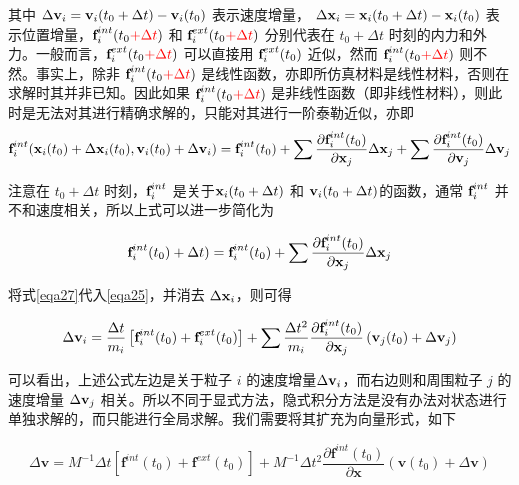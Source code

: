 其中 $\Delta \textbf{v}_i = \textbf{v}_i(t_0 + \Delta t) - \textbf{v}_i(t_0)$ 表示速度增量， $\Delta \textbf{x}_i = \textbf{x}_i(t_0 + \Delta t) - \textbf{x}_i(t_0)$ 表示位置增量，$\textbf{f}_i^{int}(t_0 \textcolor{red}{+ \Delta t})$ 和 $\textbf{f}_i^{ext}(t_0 \textcolor{red}{+ \Delta t})$ 分别代表在 $t_0 + \Delta t$ 时刻的内力和外力。一般而言，$\textbf{f}_i^{ext}(t_0 \textcolor{red}{+ \Delta t})$ 可以直接用 $\textbf{f}_i^{ext}(t_0)$ 近似，然而 $\textbf{f}_i^{int}(t_0 \textcolor{red}{+ \Delta t})$ 则不然。事实上，除非 $\textbf{f}_i^{int}(t_0 \textcolor{red}{+ \Delta t})$ 是线性函数，亦即所仿真材料是线性材料，否则在求解时其并非已知。因此如果 $\textbf{f}_i^{int}(t_0 \textcolor{red}{+ \Delta t})$ 是非线性函数（即非线性材料），则此时是无法对其进行精确求解的，只能对其进行一阶泰勒近似，亦即
\begin{equation}
\textbf{f}_i^{int}(\textbf{x}_i(t_0) + \Delta \textbf{x}_i(t_0),\textbf{v}_i(t_0)+\Delta \textbf{v}_i) = \textbf{f}_i^{int}(t_0) +
                                                         \sum\frac{\partial \textbf{f}_i^{int}(t_0)}{\partial \textbf{x}_j}\Delta \textbf{x}_j+
                                                         \sum\frac{\partial \textbf{f}_i^{int}(t_0)}{\partial \textbf{v}_j}\Delta \textbf{v}_j
\end{equation}

注意在 $t_0 + \Delta t$ 时刻，$\textbf{f}_i^{int}$ 是关于$\textbf{x}_i(t_0 + \Delta t)$ 和 $\textbf{v}_i(t_0 + \Delta t)$的函数，通常 $\textbf{f}_i^{int}$ 并不和速度相关，所以上式可以进一步简化为

\begin{equation}
\label{eqa27}
\textbf{f}_i^{int}(t_0)+ \Delta t) = \textbf{f}_i^{int}(t_0) +\sum\frac{\partial \textbf{f}_i^{int}(t_0)}{\partial \textbf{x}_j}\Delta \textbf{x}_j
\end{equation}

将式\ref{eqa27}代入\ref{eqa25}，并消去 $\Delta \textbf{x}_i$，则可得

\begin{equation}
\Delta \textbf{v}_i = \frac{\Delta t}{m_i}\left[\textbf{f}_i^{int}(t_0) + \textbf{f}_i^{ext}(t_0)\right]
           + \sum\frac{\Delta t^2}{m_i} \frac{\partial \textbf{f}_i^{int}(t_0)}{\partial \textbf{x}_j}
             \left(\textbf{v}_j(t_0) + \Delta \textbf{v}_j\right)
\end{equation}

可以看出，上述公式左边是关于粒子 $i$ 的速度增量$\Delta \textbf{v}_i$，而右边则和周围粒子 $j$ 的速度增量 $\Delta \textbf{v}_j$ 相关。所以不同于显式方法，隐式积分方法是没有办法对状态进行单独求解的，而只能进行全局求解。我们需要将其扩充为向量形式，如下

\begin{equation}
\Delta \textbf{v} = M^{-1}\Delta t\left[\textbf{f}^{int}(t_0) + \textbf{f}^{ext}(t_0)\right]
                  + M^{-1}\Delta t^2 \frac{\partial \textbf{f}^{int}(t_0)}{\partial \textbf{x}}
                    \left(\textbf{v}(t_0) + \Delta\textbf{v}\right)
\end{equation}

